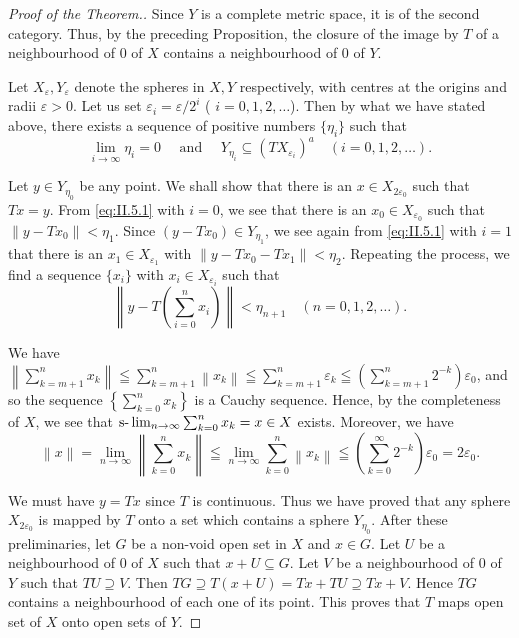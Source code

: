 \begin{proof}[Proof of the Theorem.]
Since $Y$ is a complete metric space, it is of the second category. Thus, by the preceding Proposition, the closure of the image by $T$ of a neighbourhood of $0$ of $X$ contains a neighbourhood of $0$ of $Y$.

Let $X_{\varepsilon}, Y_{\varepsilon}$ denote the spheres in $X, Y$ respectively, with centres at the origins and radii $\varepsilon > 0$. Let us set $\varepsilon_i = \varepsilon / 2^i$ ( $i = 0, 1, 2, \ldots$). Then by what we have stated above, there exists a sequence of positive numbers $\{\eta_i\}$ such that 
\begin{equation}\label{eq:II.5.1}
\lim\limits _{i \rightarrow \infty} \eta_{i} = 0 \quad \text{ and } \quad Y _ {\eta_{i}} \subseteq (T X _ {\varepsilon_{i}}) ^{a} \quad (i = 0, 1, 2, \dots).
\end{equation}

Let $y \in Y_{\eta_0}$ be any point. We shall show that there is an $x \in X_{2\varepsilon_0}$ such that $Tx = y$. From \eqref{eq:II.5.1} with $i = 0$, we see that there is an $x_0 \in X_{\varepsilon_0}$ such that $\|y - Tx_0\| < \eta_1$. Since $(y - Tx_0) \in Y_{\eta_1}$, we see again from \eqref{eq:II.5.1} with $i = 1$ that there is an $x_1 \in X_{\varepsilon_1}$ with $\|y - Tx_0 - Tx_1\| < \eta_2$. Repeating the process, we find a sequence $\{x_i\}$ with $x_i \in X_{\varepsilon_i}$ such that 
\[
\left\| y - T \left(\sum\limits_{i=0} ^{n} x _{i}\right) \right\| < \eta_{n+1} \quad (n = 0, 1, 2, \dots).
\]

We have $\left\| \sum\limits_{k=m+1}^{n} x_k \right\| \leqq \sum\limits_{k=m+1}^{n} \left\| x_k \right\| \leqq \sum\limits_{k=m+1}^{n} \varepsilon_k \leqq \left( \sum\limits_{k=m+1}^{n} 2^{-k} \right) \varepsilon_0$, and so the sequence $\left\{ \sum\limits_{k=0}^{n} x_k \right\}$ is a Cauchy sequence. Hence, by the completeness of $X$, we see that $\text{s-}\lim\nolimits_{n \to \infty} \sum\nolimits_{k=0}^{n} x_k = x \in X$ exists. Moreover, we have 
\[
\left\| x \right\| = \lim\limits _{n \rightarrow \infty} \left\| \sum\limits_{k=0} ^{n} x _{k} \right\| \leqq \lim\limits _{n \rightarrow \infty} \sum\limits_{k=0} ^{n} \left\| x _{k} \right\| \leqq \left(\sum\limits_{k=0} ^{\infty} 2 ^{-k}\right) \varepsilon_{0} = 2 \varepsilon_{0}.
\]

We must have $y = Tx$ since $T$ is continuous. Thus we have proved that any sphere $X_{2\varepsilon_0}$ is mapped by $T$ onto a set which contains a sphere $Y_{\eta_0}$. After these preliminaries, let $G$ be a non-void open set in $X$ and $x \in G$. Let $U$ be a neighbourhood of $0$ of $X$ such that $x + U \subseteq G$. Let $V$ be a neighbourhood of $0$ of $Y$ such that $TU \supseteq V$. Then $TG \supseteq T(x + U) = Tx + TU \supseteq Tx + V$. Hence $TG$ contains a neighbourhood of each one of its point. This proves that $T$ maps open set of $X$ onto open sets of $Y$. 
\end{proof}

